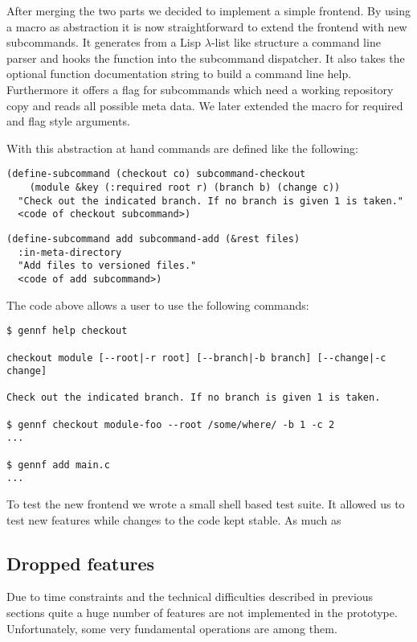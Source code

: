 \documentclass[fleqn, 10pt, a4paper]{report} \usepackage{amssymb}
\begin{document}
After merging the two parts we decided to implement a simple frontend.
By using a macro as abstraction it is now straightforward to extend
the frontend with new subcommands. It generates from a Lisp
$\lambda$-list like structure a command line parser and hooks the
function into the subcommand dispatcher. It also takes the optional
function documentation string to build a command line help.
Furthermore it offers a flag for subcommands which need a working
repository copy and reads all possible meta data. We later extended
the macro for required and flag style arguments.

With this abstraction at hand commands are defined like the following:

{\small
\begin{verbatim}
(define-subcommand (checkout co) subcommand-checkout
    (module &key (:required root r) (branch b) (change c))
  "Check out the indicated branch. If no branch is given 1 is taken."
  <code of checkout subcommand>)
\end{verbatim}

\begin{verbatim}
(define-subcommand add subcommand-add (&rest files)
  :in-meta-directory
  "Add files to versioned files."
  <code of add subcommand>)
\end{verbatim}}

The code above allows a user to use the following commands:

{\small
\begin{verbatim}
$ gennf help checkout

checkout module [--root|-r root] [--branch|-b branch] [--change|-c change]

Check out the indicated branch. If no branch is given 1 is taken.

$ gennf checkout module-foo --root /some/where/ -b 1 -c 2 
...

$ gennf add main.c
...
\end{verbatim}}

To test the new frontend we wrote a small shell based test suite. It
allowed us to test new features while changes to the code kept stable.
As much as

\subsection{Dropped features}

Due to time constraints and the technical difficulties described in
previous sections quite a huge number of features are not
implemented in the prototype. Unfortunately, some very fundamental
operations are among them.
\end{document}
